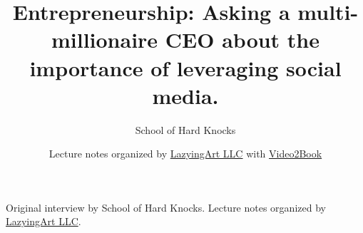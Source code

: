 \documentclass[11pt,oneside]{book}
\begin{document}
\frontmatter
\title{Entrepreneurship: Asking a multi-millionaire CEO about the importance of leveraging social media.}
\author{School of Hard Knocks}
\date{Lecture notes organized by \href{https://lazying.art}{LazyingArt LLC} with \href{https://github.com/lachlanchen/Video2Book}{Video2Book}}
\maketitle
\begin{center}
\small Original interview by School of Hard Knocks. Lecture notes organized by \href{https://lazying.art}{LazyingArt LLC}.
\end{center}
\clearpage
\mainmatter

\end{document}

